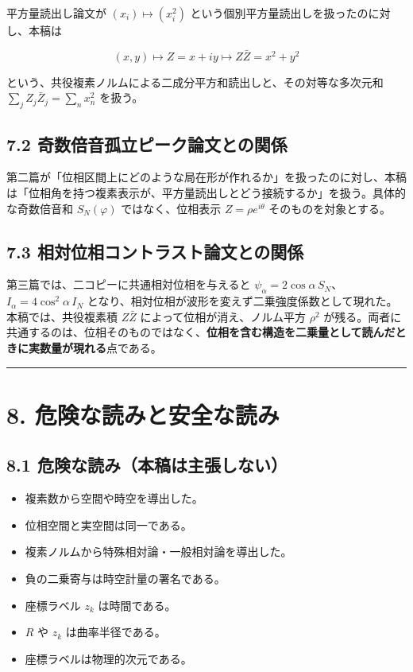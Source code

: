 \documentclass[11pt,a4paper]{ltjsarticle}
\providecommand{\tightlist}{\setlength{\itemsep}{0pt}\setlength{\parskip}{0pt}}
\begin{document}
平方量読出し論文が \((x_i)\longmapsto(x_i^2)\)
という個別平方量読出しを扱ったのに対し、本稿は

\[
(x,y)\longmapsto Z=x+iy\longmapsto Z\bar Z=x^2+y^2
\]

という、共役複素ノルムによる二成分平方和読出しと、その対等な多次元和
\(\sum_j Z_j\bar Z_j=\sum_n x_n^2\) を扱う。

\subsection{7.2
奇数倍音孤立ピーク論文との関係}\label{ux5947ux6570ux500dux97f3ux5b64ux7acbux30d4ux30fcux30afux8ad6ux6587ux3068ux306eux95a2ux4fc2}

第二篇が「位相区間上にどのような局在形が作れるか」を扱ったのに対し、本稿は「位相角を持つ複素表示が、平方量読出しとどう接続するか」を扱う。具体的な奇数倍音和
\(S_N(\varphi)\) ではなく、位相表示 \(Z=\rho e^{i\theta}\)
そのものを対象とする。

\subsection{7.3
相対位相コントラスト論文との関係}\label{ux76f8ux5bfeux4f4dux76f8ux30b3ux30f3ux30c8ux30e9ux30b9ux30c8ux8ad6ux6587ux3068ux306eux95a2ux4fc2}

第三篇では、二コピーに共通相対位相を与えると
\(\psi_\alpha=2\cos\alpha\,S_N\)、\(I_\alpha=4\cos^2\alpha\,I_N\)
となり、相対位相が波形を変えず二乗強度係数として現れた。本稿では、共役複素積
\(Z\bar Z\) によって位相が消え、ノルム平方 \(\rho^2\)
が残る。両者に共通するのは、位相そのものではなく、\textbf{位相を含む構造を二乗量として読んだときに実数量が現れる}点である。

\begin{center}\rule{0.5\linewidth}{0.5pt}\end{center}

\section{8.
危険な読みと安全な読み}\label{ux5371ux967aux306aux8aadux307fux3068ux5b89ux5168ux306aux8aadux307f}

\subsection{8.1
危険な読み（本稿は主張しない）}\label{ux5371ux967aux306aux8aadux307fux672cux7a3fux306fux4e3bux5f35ux3057ux306aux3044}

\begin{itemize}
\tightlist
\item
  複素数から空間や時空を導出した。
\item
  位相空間と実空間は同一である。
\item
  複素ノルムから特殊相対論・一般相対論を導出した。
\item
  負の二乗寄与は時空計量の署名である。
\item
  座標ラベル \(z_k\) は時間である。
\item
  \(R\) や \(z_k\) は曲率半径である。
\item
  座標ラベルは物理的次元である。
\end{itemize}
\end{document}

